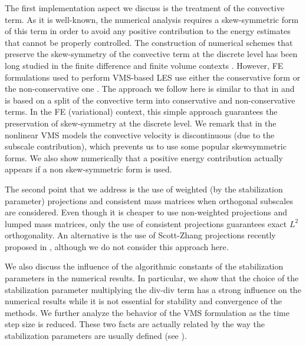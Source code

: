 The first implementation aspect we discuss is the treatment of the convective term. As it is well-known, the numerical analysis \cite{badia_convergence_2014,burman_galerkin_2009,guermond_faedogalerkin_2007} requires a skew-symmetric form of this term in order to avoid any positive contribution to the energy estimates that cannot be properly controlled. The construction of numerical schemes that preserve the skew-symmetry of the convective term at the discrete level has been long studied in the finite difference and finite volume contexts \cite{arakawa_computational_1966, verstappen_symmetry-preserving_2003, gassner_skew-symmetric_2013, trias_symmetry-preserving_2014, del_rey_fernandez_review_2014, svard_review_2014}. However, FE formulations used to perform VMS-based LES use either the conservative form \cite{hughes_large_2000,koobus_variational_2004,bazilevs_variational_2007,calderer_residual-based_2013, Calo_2004,gamnitzer_time-dependent_2010,gravemeier_algebraic_2010,masud_variational_2011} or the non-conservative one \cite{john_variants_2008,codina_time_2007,principe_dissipative_2010}. The approach we follow here is similar to that in \cite{Temam_1984} and is based on a split of the convective term into conservative and non-conservative terms. In the FE (variational) context, this simple approach guarantees the preservation of skew-symmetry at the discrete level. We remark that in the nonlinear VMS models the convective velocity is discontinuous (due to the subscale contribution), which prevents us to use some popular skewsymmetric forms. We also show numerically that a positive energy contribution actually appears if a non skew-symmetric form is used. 

The second point that we address is the use of weighted (by the stabilization parameter) projections and consistent mass matrices when orthogonal subscales are considered. Even though it is cheaper to use non-weighted projections and lumped mass matrices, only the use of consistent projections guarantees exact $L^2$ orthogonality. An alternative is the use of Scott-Zhang projections recently proposed in \cite{badia_stabilized_2012}, although we do not consider this approach here.

We also discuss the influence of the algorithmic constants of the stabilization parameters in the numerical results. In particular, we show that the choice of the stabilization parameter multiplying the div-div term has a strong influence on the numerical results while it is not essential for stability and convergence of the methods. We further analyze the behavior of the VMS formulation as the time step size is reduced. These two facts are actually related by the way the stabilization parameters are usually defined (see \cite{gamnitzer_time-dependent_2010,hsu_improving_2010}).

